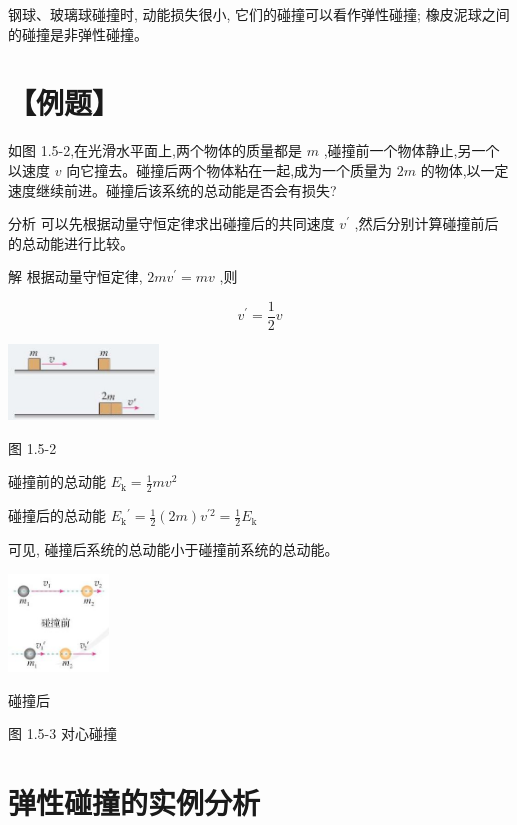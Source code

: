 \documentclass[10pt]{article}
\begin{document}
钢球、玻璃球碰撞时, 动能损失很小, 它们的碰撞可以看作弹性碰撞; 橡皮泥球之间的碰撞是非弹性碰撞。

\section*{【例题】}

如图 1.5-2,在光滑水平面上,两个物体的质量都是 \(m\) ,碰撞前一个物体静止,另一个以速度 \(v\) 向它撞去。碰撞后两个物体粘在一起,成为一个质量为 \({2m}\) 的物体,以一定速度继续前进。碰撞后该系统的总动能是否会有损失?

分析 可以先根据动量守恒定律求出碰撞后的共同速度 \({v}^{\prime }\) ,然后分别计算碰撞前后的总动能进行比较。

解 根据动量守恒定律, \({2m}{v}^{\prime } = {mv}\) ,则

\[
{v}^{\prime } = \frac{1}{2}v
\]

\begin{center}
\includegraphics[max width=0.3\textwidth]{images/01910e4c-ebb8-7d2c-8f2f-2375bc1d2d12_27_109251.jpg}
\end{center}

图 1.5-2

碰撞前的总动能 \({E}_{\mathrm{k}} = \frac{1}{2}m{v}^{2}\)

碰撞后的总动能 \({E}_{\mathrm{k}}{}^{\prime } = \frac{1}{2}\left( {2m}\right) {v}^{\prime 2} = \frac{1}{2}{E}_{\mathrm{k}}\)

可见, 碰撞后系统的总动能小于碰撞前系统的总动能。

\begin{center}
\includegraphics[max width=0.2\textwidth]{images/01910e4c-ebb8-7d2c-8f2f-2375bc1d2d12_27_832482.jpg}
\end{center}

碰撞后

图 1.5-3 对心碰撞

\section*{弹性碰撞的实例分析}
\end{document}
